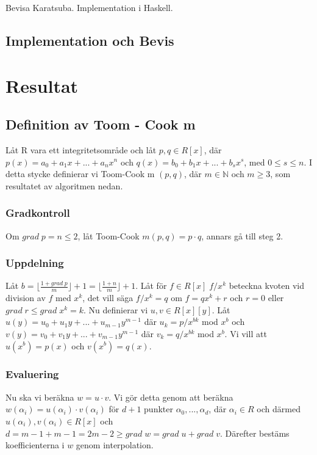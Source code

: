 \documentclass[a4paper]{article}
\begin{document}
Bevisa Karatsuba. Implementation i Haskell.

\subsection{Implementation och Bevis}
\section{Resultat}
\subsection{Definition av Toom - Cook m}
Låt R vara ett integritetsområde och låt $p, q \in R[x]$, där $p(x)= a_0 + a_1 x + ... + a_n x^n$ och
$q(x) = b_0 + b_1 x + ... + b_s x^s$, med $0 \leq s \leq n$. I detta stycke definierar vi Toom-Cook m $(p, q)$, där
$m \in \mathbb{N}$ och $m \geq 3$, som resultatet av algoritmen nedan.

\subsubsection{Gradkontroll}
Om $grad \; p = n \leq 2$, låt Toom-Cook $m (p, q) = p \cdot q$, annars gå till steg 2.

\subsubsection{Uppdelning}
Låt $b=\displaystyle \lfloor \frac{1 + grad \; p}{m}\rfloor + 1 = \lfloor \frac{1 + n}{m}\rfloor + 1$.
Låt för $f \in R[x] \; f / x^k$ beteckna kvoten vid division av $f$ med $x^k$, det vill säga $f/x^k = q$ om $f = q x^k + r$
och $r = 0$ eller $grad \;r \leq grad \; x^k = k$.
Nu definierar vi $u, v \in R[x][y]$. Låt $u(y)=u_0 + u_1 y + ... + u_{m-1} y^{m-1}$ där $u_k = p / x^{bk}$ mod $x^b$ och
 $v(y)=v_0 + v_1 y + ... + v_{m-1} y^{m-1}$ där $v_k = q / x^{bk}$ mod $x^b$. Vi vill att $u(x^b)=p(x)$ och $v(x^b)=q(x)$.

\subsubsection{Evaluering}
Nu ska vi beräkna $w = u \cdot v$. Vi gör detta genom att beräkna $w(\alpha_i)=u(\alpha_i) \cdot v(\alpha_i)$
för $d + 1$ punkter $\alpha_0, ...,  \alpha_d$, där $\alpha_i \in R$ och därmed $u(\alpha_i), v(\alpha_i) \in R[x]$
och $d = m - 1 + m -1 = 2m-2 \geq grad \; w = grad \; u + grad \; v$. Därefter bestäms koefficienterna i $w$ genom interpolation.
\end{document}
